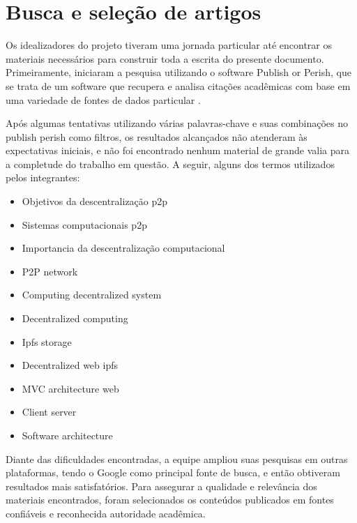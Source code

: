 \section{Busca e seleção de artigos}
Os idealizadores do projeto tiveram uma jornada particular até encontrar os materiais necessários para construir toda a escrita do presente documento. Primeiramente, iniciaram a pesquisa utilizando o software Publish or Perish, que se trata de um software que recupera e analisa citações acadêmicas com base em uma variedade de fontes de dados particular \cite{harzing2025publish}.

Após algumas tentativas utilizando várias palavras-chave e suas combinações no publish perish como filtros, os resultados alcançados não atenderam às expectativas iniciais, e não foi encontrado nenhum material de grande valia para a completude do trabalho em questão. A seguir, alguns dos termos utilizados pelos integrantes: 

\begin{itemize}
    \item Objetivos da descentralização p2p
    \item Sistemas computacionais p2p
    \item Importancia da descentralização computacional
    \item P2P network
    \item Computing decentralized system
    \item Decentralized computing
    \item Ipfs storage
    \item Decentralized web ipfs
    \item MVC architecture web
    \item Client server
    \item Software architecture
\end{itemize}

Diante das dificuldades encontradas, a equipe ampliou suas pesquisas em outras plataformas, tendo o Google como principal fonte de busca, e então obtiveram resultados mais satisfatórios. Para assegurar a qualidade e relevância dos materiais encontrados, foram selecionados os conteúdos publicados em fontes confiáveis e reconhecida autoridade acadêmica.